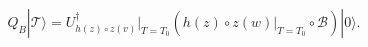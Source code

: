 \begin{equation} %
  Q_B|\mathcal{T}\rangle = U_{h(z)\circ z(v)}^{\dagger} \bigg|_{T=T_0}
  (h(z)\circ z(w)\bigg|_{T=T_0} \circ \mathcal{B})|0\rangle.
\end{equation} 

